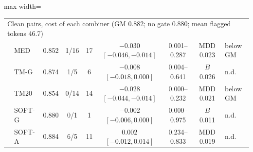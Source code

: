 \begin{table}[!tbp]
\begin{adjustbox}{max width=\textwidth}
\begin{tabular}{llccccccl}
\midrule
\multicolumn{9}{l}{Clean pairs, cost of each combiner \quad (GM 0.882; no gate 0.880; mean flagged tokens 46.7)} \\
& MED & 0.852 & 1/16 & 17 & $\mathbf{-0.030}$ $[-0.046,-0.014]$ & 0.001--0.287 & MDD 0.023 & below GM \\
& TM-G & 0.874 & 1/5 & 6 & $-0.008$ $[-0.018,0.000]$ & 0.004--0.641 & $B$ 0.026 & n.d. \\
& TM20 & 0.854 & 0/14 & 14 & $\mathbf{-0.028}$ $[-0.044,-0.014]$ & 0.000--0.232 & MDD 0.021 & below GM \\
& SOFT-G & 0.880 & 0/1 & 1 & $-0.002$ $[-0.006,0.000]$ & 0.000--0.975 & $B$ 0.011 & n.d. \\
& SOFT-A & 0.884 & 6/5 & 11 & $0.002$ $[-0.012,0.014]$ & 0.234--0.833 & MDD 0.019 & n.d. \\
\bottomrule
\end{tabular}
\end{adjustbox}
\end{table}

